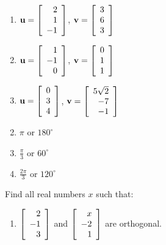 \begin{multicols}{2}
\begin{ex}
\begin{enumerate}[label={\alph*.}]
\item $\textbf{u} = \left[
\begin{array}{r}
2\\
1\\
-1
\end{array}
\right]$, 
$\textbf{v} = \left[
\begin{array}{r}
3\\
6\\
3
\end{array}
\right]
$

\item $\textbf{u} = \left[
\begin{array}{r}
1\\
-1\\
0
\end{array}
\right]$, 
$\textbf{v} = \left[
\begin{array}{r}
0\\
1\\
1
\end{array}
\right]
$

\item $\textbf{u} = \left[
\begin{array}{r}
0\\
3\\
4
\end{array}
\right]$, 
$\textbf{v} = \left[
\begin{array}{r}
5\sqrt{2}\\
-7\\
-1
\end{array}
\right]
$


\end{enumerate}
\begin{sol}
\begin{enumerate}[label={\alph*.}]
\setcounter{enumi}{1}
\item  $\pi$ or $180^\circ$ 

\setcounter{enumi}{3}
\item  $\frac{\pi}{3}$ or $60^\circ$

\setcounter{enumi}{5}
\item  $\frac{2\pi}{3}$ or $120^\circ$


\end{enumerate}
\end{sol}
\end{ex}

\begin{ex}
Find all real numbers $x$ such that:


\begin{enumerate}[label={\alph*.}]
\item $\left[
\begin{array}{r}
2\\
-1\\
3
\end{array}
\right]$
and 
$\left[
\begin{array}{r}
x\\
-2\\
1
\end{array}
\right]$
are orthogonal.


\end{enumerate}
\end{ex}
\end{multicols}
